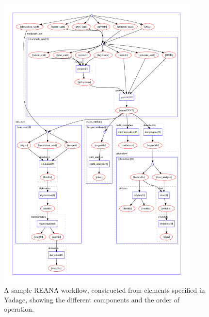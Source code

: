 \documentclass[12pt,a4paper]{article}
\begin{document}
\begin{figure}[bthp]
    \centering
 \includegraphics[width=0.9\textwidth]{yadage_workflow_instance.pdf}
    \caption{A sample REANA workflow, constructed from elements specified in Yadage, showing the different components and the order of operation.}
    \label{fig:workflow}
\end{figure}
\end{document}
